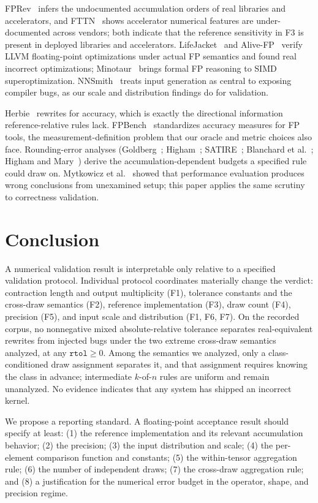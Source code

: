 \documentclass[twocolumn,10pt]{article}
\newcommand{\rtol}{\texttt{rtol}}
\begin{document}
FPRev~\cite{fprev} infers the undocumented accumulation orders of real
libraries and accelerators, and FTTN~\cite{fttn} shows accelerator
numerical features are under-documented across vendors; both indicate
that the reference sensitivity in F3 is present in deployed libraries
and accelerators. LifeJacket~\cite{lifejacket} and Alive-FP~\cite{alivefp}
verify LLVM floating-point optimizations under actual FP semantics and
found real incorrect optimizations; Minotaur~\cite{minotaur} brings
formal FP reasoning to SIMD superoptimization. NNSmith~\cite{nnsmith}
treats input generation as central to exposing compiler bugs, as our
scale and distribution findings do for validation.

Herbie~\cite{herbie} rewrites for accuracy, which is exactly the
directional information reference-relative rules lack.
FPBench~\cite{fpbench} standardizes accuracy measures for FP tools, the
measurement-definition problem that our oracle and metric choices also
face. Rounding-error analyses (Goldberg~\cite{goldberg};
Higham~\cite{higham}; SATIRE~\cite{satire}; Blanchard et
al.~\cite{blanchard}; Higham and Mary~\cite{highammary}) derive the
accumulation-dependent budgets a specified rule could draw on. Mytkowicz
et al.~\cite{wrongdata} showed that performance evaluation produces
wrong conclusions from unexamined setup; this paper applies the same
scrutiny to correctness validation.

\section{Conclusion}

A numerical validation result is interpretable only relative to a
specified validation protocol. Individual protocol coordinates
materially change the verdict: contraction length and output
multiplicity (F1), tolerance constants and the cross-draw semantics
(F2), reference implementation (F3), draw count (F4), precision (F5),
and input scale and distribution (F1, F6, F7). On the recorded corpus,
no nonnegative mixed absolute-relative tolerance separates
real-equivalent rewrites from injected bugs under the two extreme
cross-draw semantics analyzed, at any $\rtol \ge 0$. Among the semantics
we analyzed, only a class-conditioned draw assignment separates it, and
that assignment requires knowing the class in advance; intermediate
$k$-of-$n$ rules are uniform and remain unanalyzed. No evidence
indicates that any system has shipped an incorrect kernel.

We propose a reporting standard. A floating-point acceptance result
should specify at least: (1) the reference implementation and its
relevant accumulation behavior; (2) the precision; (3) the input
distribution and scale; (4) the per-element comparison function and
constants; (5) the within-tensor aggregation rule; (6) the number of
independent draws; (7) the cross-draw aggregation rule; and (8) a
justification for the numerical error budget in the operator, shape, and
precision regime.
\end{document}
